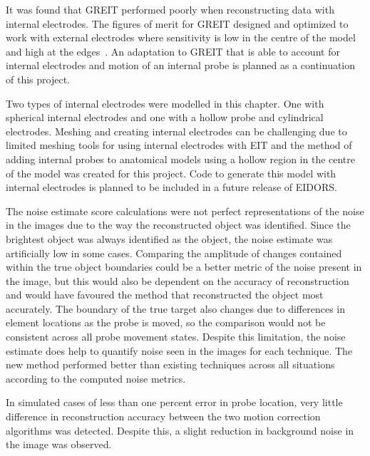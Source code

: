 It was found that GREIT performed poorly when reconstructing data with internal electrodes.
The figures of merit for GREIT designed and optimized to work with external electrodes 
where sensitivity is low in the centre of the model and high at the 
edges~\parencite{adler_greit_2009}. An adaptation to GREIT that is able to 
account for internal electrodes and motion of an internal probe is planned as a
continuation of this project.  

Two types of internal electrodes were modelled in this chapter. One with
spherical internal electrodes and one with a hollow probe and cylindrical electrodes. 
Meshing and creating internal electrodes can be challenging due to limited meshing tools 
for using internal electrodes with EIT and the method of adding internal probes to
anatomical models using a hollow region in the centre of the model was created for this 
project. Code to generate this model with internal electrodes is planned to be included in a
future release of EIDORS.

The noise estimate score calculations were not perfect representations of the noise
in the images due to the way the reconstructed object was identified.  Since the
brightest object was always identified as the object, the noise estimate was
artificially low in some cases. 
Comparing the amplitude of changes contained within the true
object boundaries could be a better metric of the noise present in the image, but this
would also be dependent on the accuracy of reconstruction and would have favoured
the method that reconstructed the object most accurately.
The boundary of the true target
also changes due to differences in element locations as the 
probe is moved, so the comparison would not be consistent across all probe movement
states. Despite this limitation, the noise estimate does help to quantify 
noise seen in the images for each technique. 
The new
method performed better than existing techniques across all situations according to the computed
noise metrics.

In simulated cases of less than one percent error in probe location, very little 
difference in reconstruction accuracy between 
the two motion correction algorithms was detected. 
Despite this, a slight reduction 
in background noise in the image was observed. 

